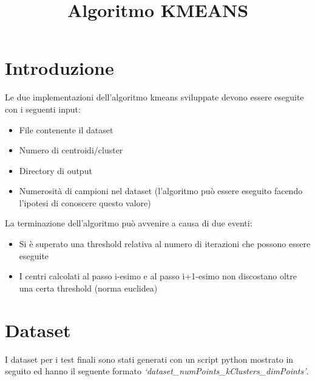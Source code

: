 \documentclass[a4paper, oneside]{article}
\begin{document}
\baselineskip 13pt

\begin{frontespizio} 
 \Preambolo{\renewcommand{\frontpretitlefont}{\fontsize{15}{12}\scshape}}
\Rientro {1cm}
 \Punteggiatura {}
\end{frontespizio}

\clearpage

	\tableofcontents\thispagestyle{empty}
	\clearpage


\title{Algoritmo KMEANS}

\section{Introduzione}
Le due implementazioni dell'algoritmo kmeans sviluppate devono essere eseguite con i seguenti input:\\
\begin{itemize}
\item File contenente il dataset
\item Numero di centroidi/cluster
\item Directory di output
\item Numerosità di campioni nel dataset (l'algoritmo può essere eseguito facendo l'ipotesi di conoscere questo valore)
\end{itemize}
\vspace{4mm}
La terminazione dell'algoritmo può avvenire a causa di due eventi:
\begin{itemize}
\item Si è superato una threshold relativa al numero di iterazioni che possono essere eseguite
\item I centri calcolati al passo i-esimo e al passo i+1-esimo non discostano oltre una certa threshold (norma euclidea)
\end{itemize}

\section{Dataset}
I dataset per i test finali sono stati generati con un script python mostrato in seguito ed hanno il seguente formato \textit{`dataset\_numPoints\_kClusters\_dimPoints'}.\\
\end{document}
